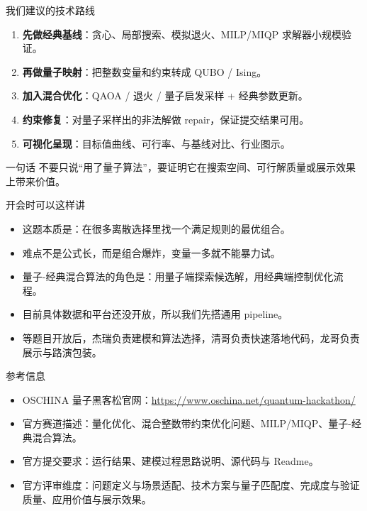 \documentclass[aspectratio=169]{beamer}
\newcommand{\term}[1]{\textcolor{QuantumBlue}{\textbf{#1}}}
\begin{document}
\begin{frame}{我们建议的技术路线}
\small
\begin{enumerate}
  \item \term{先做经典基线}：贪心、局部搜索、模拟退火、MILP/MIQP 求解器小规模验证。
  \item \term{再做量子映射}：把整数变量和约束转成 QUBO / Ising。
  \item \term{加入混合优化}：QAOA / 退火 / 量子启发采样 + 经典参数更新。
  \item \term{约束修复}：对量子采样出的非法解做 repair，保证提交结果可用。
  \item \term{可视化呈现}：目标值曲线、可行率、与基线对比、行业图示。
\end{enumerate}

\begin{block}{一句话}
  不要只说“用了量子算法”，要证明它在搜索空间、可行解质量或展示效果上带来价值。
\end{block}
\end{frame}

\begin{frame}{开会时可以这样讲}
\small
\begin{itemize}
  \item 这题本质是：在很多离散选择里找一个满足规则的最优组合。
  \item 难点不是公式长，而是组合爆炸，变量一多就不能暴力试。
  \item 量子-经典混合算法的角色是：用量子端探索候选解，用经典端控制优化流程。
  \item 目前具体数据和平台还没开放，所以我们先搭通用 pipeline。
  \item 等题目开放后，杰瑞负责建模和算法选择，清哥负责快速落地代码，龙哥负责展示与路演包装。
\end{itemize}
\end{frame}

\begin{frame}{参考信息}
\small
\begin{itemize}
  \item OSCHINA 量子黑客松官网：\url{https://www.oschina.net/quantum-hackathon/}
  \item 官方赛道描述：量化优化、混合整数带约束优化问题、MILP/MIQP、量子-经典混合算法。
  \item 官方提交要求：运行结果、建模过程思路说明、源代码与 Readme。
  \item 官方评审维度：问题定义与场景适配、技术方案与量子匹配度、完成度与验证质量、应用价值与展示效果。
\end{itemize}
\end{frame}
\end{document}

